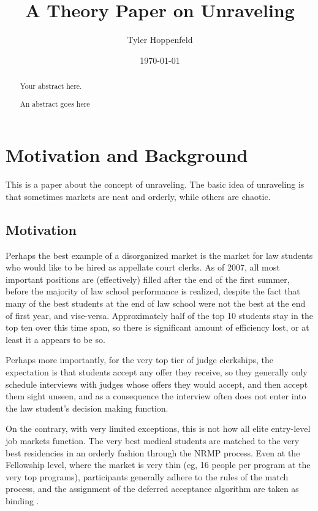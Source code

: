 \documentclass[WP]{AEA}
\begin{document}
\title{A Theory Paper on Unraveling}
\author{Tyler Hoppenfeld}
\date{\today}
\JEL{}
\Keywords{}



\begin{abstract}
Your abstract here.
\end{abstract}


\maketitle

\begin{abstract}
	An abstract goes here
\end{abstract}

\section{Motivation and Background}


This is a paper about the concept of unraveling.  The basic idea of unraveling is that sometimes markets are neat and orderly, while others are chaotic.

\subsection{Motivation}
Perhaps the best example of a disorganized market is the market for law students who would like to be hired as appellate court clerks.  As of 2007, all most important positions are (effectively) filled after the end of the first summer, before the majority of law school performance is realized, despite the fact that many of the best students at the end of law school were not the best at the end of first year, and vise-versa. Approximately half of the top 10 students stay in the top ten over this time span, so there is significant amount of efficiency lost, or at least it a appears to be so.

Perhaps more importantly, for the very top tier of judge clerkships, the expectation is that students accept any offer they receive, so they generally only schedule interviews with judges whose offers they would accept, and then accept them sight unseen, and as a consequence the interview often does not enter into the law student's decision making function. \cite{Avery2001}

On the contrary, with very limited exceptions, this is not how all elite entry-level job markets function.  The very best medical students are matched to the very best residencies in an orderly fashion through the NRMP process.  Even at the Fellowship level, where the market is very thin (eg, 16 people per program at the very top programs), participants generally adhere to the rules of the match process, and the assignment of the deferred acceptance algorithm are taken as binding \cite{Niederle2008,Niederle2003,Niederle2005}.
\end{document}
